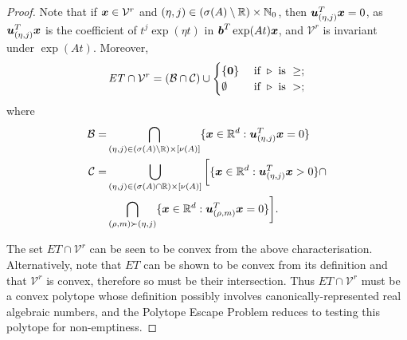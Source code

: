 \begin{proof}
Note that if $\boldsymbol{x}\in\mathcal{V}^{r}$ and $(\eta,j)\in
(\sigma(A)\setminus \mathbb{R})\times \mathbb{N}_{0}$, then
$\boldsymbol{u}_{(\eta,j)}^{T}\boldsymbol{x}=0$, as
$\boldsymbol{u}_{(\eta,j)}^{T}\boldsymbol{x}$ is the coefficient of $t^{j} \exp(\eta
t)$ in $\boldsymbol{b}^{T}\exp(At) \boldsymbol{x}$, and $\mathcal{V}^{r}$ is
invariant under $\exp(At)$. Moreover,
%
\begin{align*}
\mathit{ET}\cap\mathcal{V}^{r}=(\mathcal{B}\cap\mathcal{C}) \cup
\begin{cases}
\lbrace \boldsymbol{0} \rbrace & \text{ if } \triangleright \text{ is } \geq ; \\
\emptyset & \text{ if } \triangleright \text{ is } > ;
\end{cases}
\end{align*}
where
\begin{align*}
\mathcal{B}=&\bigcap\limits_{(\eta,j)\in (\sigma(A)\setminus \mathbb{R})\times [\nu(A)]} \lbrace \boldsymbol{x}\in\mathbb{R}^{d}: \boldsymbol{u}_{(\eta,j)}^{T} \boldsymbol{x}=0 \rbrace \\
\mathcal{C}=&\bigcup\limits_{(\eta,j)\in(\sigma(A)\cap \mathbb{R})\times [\nu(A)]} \bigg[ \lbrace \boldsymbol{x}\in\mathbb{R}^{d}: \boldsymbol{u}_{(\eta,j)}^{T} \boldsymbol{x}>0 \rbrace \cap \\
&\bigcap\limits_{(\rho,m)\succ (\eta,j)} \lbrace \boldsymbol{x}\in\mathbb{R}^{d}: \boldsymbol{u}_{(\rho,m)}^{T} \boldsymbol{x}=0 \rbrace \bigg].
\end{align*}

The set $\mathit{ET}\cap\mathcal{V}^{r}$ can be seen to be convex from
the above characterisation. Alternatively, note that $\mathit{ET}$ can
be shown to be convex from its definition and that $\mathcal{V}^{r}$
is convex, therefore so must be their intersection. Thus
$\mathit{ET}\cap\mathcal{V}^{r}$ must be a convex polytope whose
definition possibly involves canonically-represented real algebraic
numbers, and the Polytope Escape Problem reduces to testing this
polytope for non-emptiness.
\end{proof}
